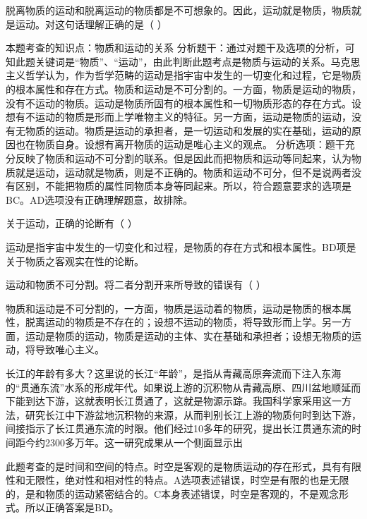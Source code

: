 \question 脱离物质的运动和脱离运动的物质都是不可想象的。因此，运动就是物质，物质就是运动。对这句话理解正确的是（
）
\par{}
\begin{solution}本题考查的知识点：物质和运动的关系
分析题干：通过对题干及选项的分析，可知此题关键词是``物质''、``运动''，由此判断此题考点是物质与运动的关系。马克思主义哲学认为，作为哲学范畴的运动是指宇宙中发生的一切变化和过程，它是物质的根本属性和存在方式。物质和运动是不可分割的。一方面，物质是运动的物质，没有不运动的物质。运动是物质所固有的根本属性和一切物质形态的存在方式。设想有不运动的物质是形而上学唯物主义的特征。另一方面，运动是物质的运动，没有无物质的运动。物质是运动的承担者，是一切运动和发展的实在基础，运动的原因也在物质自身。设想有离开物质的运动是唯心主义的观点。
分析选项：题干充分反映了物质和运动不可分割的联系。但是因此而把物质和运动等同起来，认为物质就是运动，运动就是物质，则是不正确的。物质和运动不可分，但不是说两者没有区别，不能把物质的属性同物质本身等同起来。所以，符合题意要求的选项是BC。AD选项没有正确理解题意，故排除。
\end{solution}
\question 关于运动，正确的论断有（ ）
\par{}
\begin{solution}运动是指宇宙中发生的一切变化和过程，是物质的存在方式和根本属性。BD项是关于物质之客观实在性的论断。
\end{solution}
\question 运动和物质不可分割。将二者分割开来所导致的错误有（ ）
\par{}
\begin{solution}物质和运动是不可分割的，一方面，物质是运动着的物质，运动是物质的根本属性，脱离运动的物质是不存在的；设想不运动的物质，将导致形而上学。另一方面，运动是物质的运动，物质是运动的主体、实在基础和承担者；设想无物质的运动，将导致唯心主义。
\end{solution}
\question 长江的年龄有多大？这里说的长江``年龄''，是指从青藏高原奔流而下注入东海的``贯通东流''水系的形成年代。如果说上游的沉积物从青藏高原、四川盆地顺延而下能到达下游，这就表明长江贯通了，这就是物源示踪。我国科学家采用这一方法，研究长江中下游盆地沉积物的来源，从而判别长江上游的物质何时到达下游，间接指示了长江贯通东流的时限。他们经过10多年的研究，提出长江贯通东流的时间距今约2300多万年。这一研究成果从一个侧面显示出
\par{}
\begin{solution}此题考查的是时间和空间的特点。时空是客观的是物质运动的存在形式，具有有限性和无限性，绝对性和相对性的特点。A选项表述错误，时空是有限的也是无限的，是和物质的运动紧密结合的。C本身表述错误，时空是客观的，不是观念形式。所以正确答案是BD。
\end{solution}
